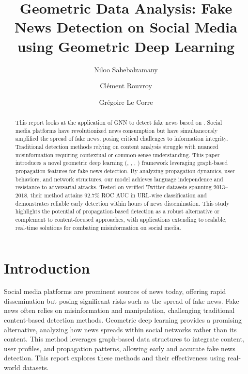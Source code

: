 \documentclass[sigconf,nonacm]{acmart}
\begin{document}
\title{Geometric Data Analysis: Fake News Detection on Social Media using Geometric Deep Learning\\
\vspace{0.5em}} %


\author{Niloo Sahebalzamany}

\author{Clément Rouvroy}

\author{Grégoire Le Corre}



\begin{abstract}
This report looks at the application of GNN to detect fake news based on \cite{monti2019fakenewsdetectionsocial}. Social media platforms have revolutionized news consumption but have simultaneously amplified the spread of fake news, posing critical challenges to information integrity. Traditional detection methods relying on content analysis struggle with nuanced misinformation requiring contextual or common-sense understanding. This paper introduces a novel geometric deep learning (\cite{LeCun2015DeepLearning}, \cite{Bruna2014SpectralNetworks}, \cite{Defferrard2016CNNGraphs}, \cite{Kipf2017GCN}) framework leveraging graph-based propagation features for fake news detection. By analyzing propagation dynamics, user behaviors, and network structures, our model achieves language independence and resistance to adversarial attacks. Tested on verified Twitter datasets spanning 2013–2018, their method attains 92.7\% ROC AUC in URL-wise classification and demonstrates reliable early detection within hours of news dissemination. This study highlights the potential of propagation-based detection as a robust alternative or complement to content-focused approaches, with applications extending to scalable, real-time solutions for combating misinformation on social media.
\end{abstract}

\maketitle

\section{Introduction}
Social media platforms are prominent sources of news today, offering rapid dissemination but posing significant risks such as the spread of fake news. Fake news often relies on misinformation and manipulation, challenging traditional content-based detection methods. Geometric deep learning provides a promising alternative, analyzing how news spreads within social networks rather than its content. This method leverages graph-based data structures to integrate content, user profiles, and propagation patterns, allowing early and accurate fake news detection. This report explores these methods and their effectiveness using real-world datasets.
\end{document}
